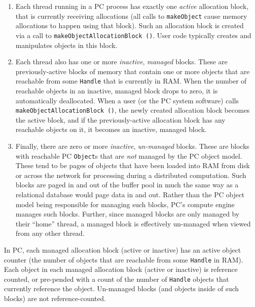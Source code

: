 \begin{enumerate}

\item Each thread running in a PC process has exactly one \emph{active} allocation block, that is currently receiving allocations (all calls to
\texttt{makeObject} cause memory allocations to happen using that block).  Such an allocation block is created via a call to 
\texttt{makeObjectAllocationBlock ()}.  User code typically creates and manipulates objects in this block.

\item Each thread also has one or more
\emph{inactive}, \emph{managed} blocks.  These are previously-active blocks of memory that contain one or more objects that are reachable
from some \texttt{Handle} that is currently in RAM.  When the number of reachable objects in an inactive, managed block drops to zero, it is automatically
deallocated.
When a user (or the PC system software) calls 
\texttt{makeObjectAllocationBlock ()}, the newly created allocation block becomes the active block, and if the previously-active allocation block has any
reachable objects on it, it becomes an inactive, managed block.

\item Finally, there are zero or more \emph{inactive},
  \emph{un-managed} blocks.  These are blocks with reachable PC
  \texttt{Object}s that are \emph{not} managed by the PC object model.  These tend to be pages of objects that have
been loaded into RAM from disk or across the network for processing
during a distributed computation.  Such blocks are paged in and out of the
buffer pool in much the same way as a relational database would page data in and out.
Rather than the PC object model being responsible for managing such blocks, PC's compute engine manages such blocks.
Further, since managed blocks are only managed by their ``home'' thread, a managed block is effectively un-managed when viewed from
any other thread.

\end{enumerate}

In PC, each managed allocation block (active or inactive) has an active object counter (the number of objects that are reachable
from some \texttt{Handle} in RAM).  Each object in each managed allocation block (active or inactive) is reference counted, or pre-pended with a count of
the number of \texttt{Handle} objects that currently reference the object.  
Un-managed blocks (and objects inside of such blocks) are not reference-counted.

